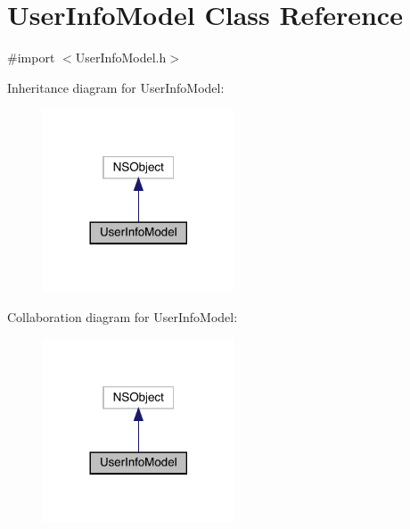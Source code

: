 \hypertarget{interface_user_info_model}{}\section{User\+Info\+Model Class Reference}
\label{interface_user_info_model}


{\ttfamily \#import $<$User\+Info\+Model.\+h$>$}



Inheritance diagram for User\+Info\+Model\+:\nopagebreak
\begin{figure}[H]
\begin{center}
\leavevmode
\includegraphics[width=161pt]{interface_user_info_model__inherit__graph}
\end{center}
\end{figure}


Collaboration diagram for User\+Info\+Model\+:\nopagebreak
\begin{figure}[H]
\begin{center}
\leavevmode
\includegraphics[width=161pt]{interface_user_info_model__coll__graph}
\end{center}
\end{figure}
